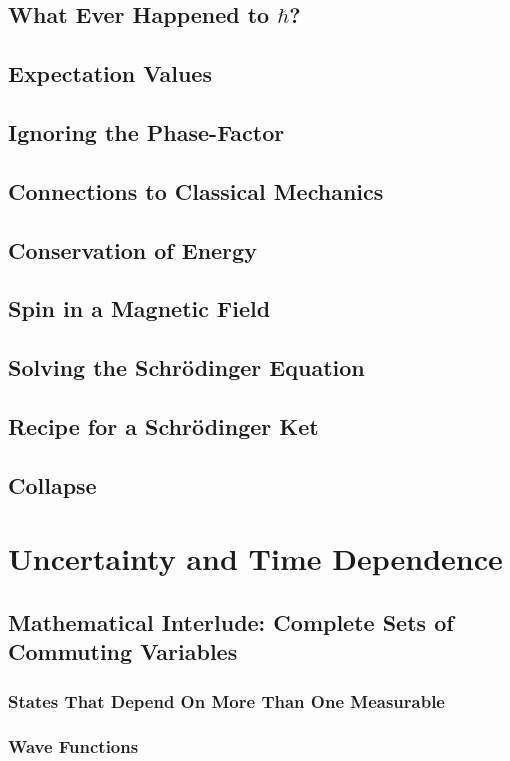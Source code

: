 \documentclass[a4paper]{article}
\begin{document}
\subsection{What Ever Happened to $\hbar$?}
\subsection{Expectation Values}
\subsection{Ignoring the Phase-Factor}
\subsection{Connections to Classical Mechanics}


\subsection{Conservation of Energy}
\subsection{Spin in a Magnetic Field}

\subsection{Solving the Schr\"odinger Equation}

\subsection{Recipe for a Schr\"odinger Ket}

\subsection{Collapse}
\section{Uncertainty and Time Dependence}
\subsection{Mathematical Interlude: Complete Sets of Commuting Variables}
\subsubsection{States That Depend On More Than One Measurable}
\subsubsection{Wave Functions}
\end{document}
